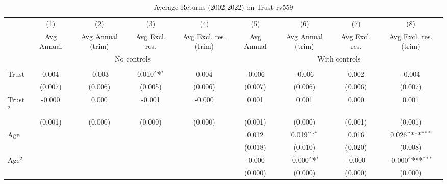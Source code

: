 \begin{table}[htbp]\centering
\def\sym#1{\ifmmode^{#1}\else\(^{#1}\)\fi}
\caption{Average Returns (2002-2022) on Trust rv559}
\begin{tabular}{l*{8}{c}}
\toprule
          &\multicolumn{1}{c}{(1)}&\multicolumn{1}{c}{(2)}&\multicolumn{1}{c}{(3)}&\multicolumn{1}{c}{(4)}&\multicolumn{1}{c}{(5)}&\multicolumn{1}{c}{(6)}&\multicolumn{1}{c}{(7)}&\multicolumn{1}{c}{(8)}\\
          &\multicolumn{1}{c}{Avg Annual}&\multicolumn{1}{c}{Avg Annual (trim)}&\multicolumn{1}{c}{Avg Excl. res.}&\multicolumn{1}{c}{Avg Excl. res. (trim)}&\multicolumn{1}{c}{Avg Annual}&\multicolumn{1}{c}{Avg Annual (trim)}&\multicolumn{1}{c}{Avg Excl. res.}&\multicolumn{1}{c}{Avg Excl. res. (trim)}\\
& \multicolumn{4}{c}{No controls} & \multicolumn{4}{c}{With controls} \\\\ \cmidrule(lr){2-5}\cmidrule(lr){6-9}
Trust     &    0.004         &   -0.003         &    0.010\sym{*}  &    0.004         &   -0.006         &   -0.006         &    0.002         &   -0.004         \\
          &  (0.007)         &  (0.006)         &  (0.005)         &  (0.006)         &  (0.007)         &  (0.006)         &  (0.006)         &  (0.007)         \\
Trust$^{2}$&   -0.000         &    0.000         &   -0.001         &   -0.000         &    0.001         &    0.001         &    0.000         &    0.001         \\
          &  (0.001)         &  (0.000)         &  (0.000)         &  (0.000)         &  (0.001)         &  (0.000)         &  (0.001)         &  (0.001)         \\
Age       &                  &                  &                  &                  &    0.012         &    0.019\sym{*}  &    0.016         &    0.026\sym{***}\\
          &                  &                  &                  &                  &  (0.018)         &  (0.010)         &  (0.020)         &  (0.008)         \\
Age$^{2}$ &                  &                  &                  &                  &   -0.000         &   -0.000\sym{*}  &   -0.000         &   -0.000\sym{***}\\
          &                  &                  &                  &                  &  (0.000)         &  (0.000)         &  (0.000)         &  (0.000)         \\

\end{tabular}
\end{table}
